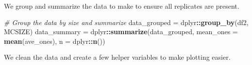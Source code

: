 \documentclass[]{book}
\newenvironment{Shaded}{\begin{snugshade}}{\end{snugshade}}
\newcommand{\CommentTok}[1]{\textcolor[rgb]{0.56,0.35,0.01}{\textit{#1}}}
\newcommand{\DataTypeTok}[1]{\textcolor[rgb]{0.13,0.29,0.53}{#1}}
\newcommand{\KeywordTok}[1]{\textcolor[rgb]{0.13,0.29,0.53}{\textbf{#1}}}
\newcommand{\NormalTok}[1]{#1}
\newcommand{\OperatorTok}[1]{\textcolor[rgb]{0.81,0.36,0.00}{\textbf{#1}}}
\newcommand{\StringTok}[1]{\textcolor[rgb]{0.31,0.60,0.02}{#1}}
\begin{document}
We group and summarize the data to make to ensure all replicates are present.

\begin{Shaded}
\begin{Highlighting}[]
\CommentTok{# Group the data by size and summarize}
\NormalTok{data_grouped =}\StringTok{ }\NormalTok{dplyr}\OperatorTok{::}\KeywordTok{group_by}\NormalTok{(df2, MCSIZE)}
\NormalTok{data_summary =}\StringTok{ }\NormalTok{dplyr}\OperatorTok{::}\KeywordTok{summarize}\NormalTok{(data_grouped, }\DataTypeTok{mean_ones =} \KeywordTok{mean}\NormalTok{(ave_ones), }\DataTypeTok{n =}\NormalTok{ dplyr}\OperatorTok{::}\KeywordTok{n}\NormalTok{())}
\end{Highlighting}
\end{Shaded}

We clean the data and create a few helper variables to make plotting easier.
\end{document}
